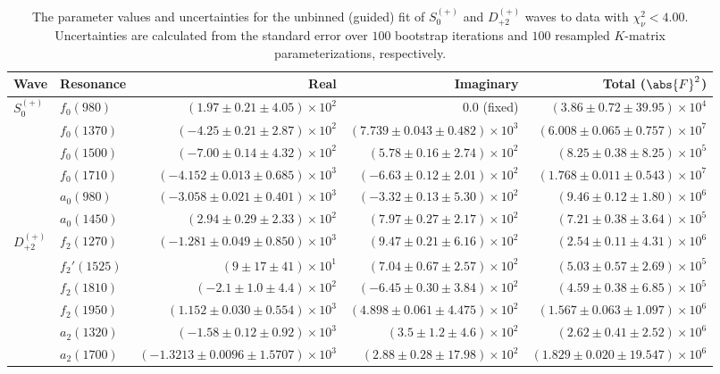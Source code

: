 \begin{table}[ht]
    \begin{center}
        \begin{tabular}{llrrr}\toprule
        Wave & Resonance & Real & Imaginary & Total ($\abs{F}^2$) \\\midrule
$S_{0}^{(+)}$ & $f_{0}(980)$ & $(1.97 \pm 0.21 \pm 4.05) \times 10^{2}$ & $0.0$ (fixed) & $(3.86 \pm 0.72 \pm 39.95) \times 10^{4}$ \\
 & $f_{0}(1370)$ & $(-4.25 \pm 0.21 \pm 2.87) \times 10^{2}$ & $(7.739 \pm 0.043 \pm 0.482) \times 10^{3}$ & $(6.008 \pm 0.065 \pm 0.757) \times 10^{7}$ \\
 & $f_{0}(1500)$ & $(-7.00 \pm 0.14 \pm 4.32) \times 10^{2}$ & $(5.78 \pm 0.16 \pm 2.74) \times 10^{2}$ & $(8.25 \pm 0.38 \pm 8.25) \times 10^{5}$ \\
 & $f_{0}(1710)$ & $(-4.152 \pm 0.013 \pm 0.685) \times 10^{3}$ & $(-6.63 \pm 0.12 \pm 2.01) \times 10^{2}$ & $(1.768 \pm 0.011 \pm 0.543) \times 10^{7}$ \\
 & $a_{0}(980)$ & $(-3.058 \pm 0.021 \pm 0.401) \times 10^{3}$ & $(-3.32 \pm 0.13 \pm 5.30) \times 10^{2}$ & $(9.46 \pm 0.12 \pm 1.80) \times 10^{6}$ \\
 & $a_{0}(1450)$ & $(2.94 \pm 0.29 \pm 2.33) \times 10^{2}$ & $(7.97 \pm 0.27 \pm 2.17) \times 10^{2}$ & $(7.21 \pm 0.38 \pm 3.64) \times 10^{5}$ \\
$D_{+2}^{(+)}$ & $f_{2}(1270)$ & $(-1.281 \pm 0.049 \pm 0.850) \times 10^{3}$ & $(9.47 \pm 0.21 \pm 6.16) \times 10^{2}$ & $(2.54 \pm 0.11 \pm 4.31) \times 10^{6}$ \\
 & $f_{2}'(1525)$ & $(9 \pm 17 \pm 41) \times 10^{1}$ & $(7.04 \pm 0.67 \pm 2.57) \times 10^{2}$ & $(5.03 \pm 0.57 \pm 2.69) \times 10^{5}$ \\
 & $f_{2}(1810)$ & $(-2.1 \pm 1.0 \pm 4.4) \times 10^{2}$ & $(-6.45 \pm 0.30 \pm 3.84) \times 10^{2}$ & $(4.59 \pm 0.38 \pm 6.85) \times 10^{5}$ \\
 & $f_{2}(1950)$ & $(1.152 \pm 0.030 \pm 0.554) \times 10^{3}$ & $(4.898 \pm 0.061 \pm 4.475) \times 10^{2}$ & $(1.567 \pm 0.063 \pm 1.097) \times 10^{6}$ \\
 & $a_{2}(1320)$ & $(-1.58 \pm 0.12 \pm 0.92) \times 10^{3}$ & $(3.5 \pm 1.2 \pm 4.6) \times 10^{2}$ & $(2.62 \pm 0.41 \pm 2.52) \times 10^{6}$ \\
 & $a_{2}(1700)$ & $(-1.3213 \pm 0.0096 \pm 1.5707) \times 10^{3}$ & $(2.88 \pm 0.28 \pm 17.98) \times 10^{2}$ & $(1.829 \pm 0.020 \pm 19.547) \times 10^{6}$ \\\bottomrule
        \end{tabular}
    \caption{The parameter values and uncertainties for the unbinned (guided) fit of $S_{0}^{(+)}$ and $D_{+2}^{(+)}$ waves to data with $\chi^2_\nu < 4.00$. Uncertainties are calculated from the standard error over $100$ bootstrap iterations and $100$ resampled $K$-matrix parameterizations, respectively.}\label{tab:unbinned-fit-chisqdof-4.0-guided-resampled-Sp0p-Dp2p}
    \end{center}
\end{table}
